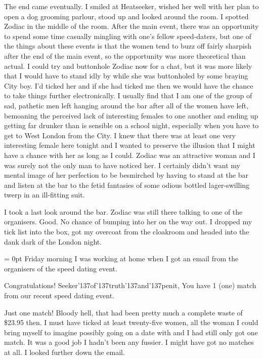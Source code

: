The end came eventually. I smiled at Heatseeker, wished her well
with her plan to open a dog grooming parlour, stood up and looked
around the room. I spotted Zodiac in the middle of the room. After
the main event, there was an opportunity to spend some time casually
mingling with one's fellow speed-daters, but one of the things about
these events is that the women tend to buzz off fairly sharpish
after the end of the main event, so the opportunity was more
theoretical than actual. I could try and buttonhole Zodiac now for a
chat, but it was more likely that I would have to stand idly by
while she was buttonholed by some braying City boy. I'd ticked her
and if she had ticked me then we would have the chance to take
things further electronically. I usually find that I am one of the
group of sad, pathetic men left hanging around the bar after all of
the women have left, bemoaning the perceived lack of interesting
females to one another and ending up getting far drunker than is
sensible on a school night, especially when you have to get to West
London from the City. I knew that there was at least one {\twelveit
very\/} interesting female here tonight and I wanted to preserve the
illusion that I might have a chance with her as long as I could.
Zodiac was an attractive woman and I was surely not the only man to
have noticed her. I certainly didn't want my mental image of her
perfection to be besmirched by having to stand at the bar and listen at the bar to the
fetid fantasies of some odious bottled lager-swilling twerp in an
ill-fitting suit.

I took a last look around the bar. Zodiac was still there talking to
one of the organisers. Good. No chance of bumping into her on the
way out. I dropped my tick list into the box, got my overcoat from
the cloakroom and headed into the dank dark of the London night.

\vskip 1cm

{\parindent = 0pt Friday morning I was working at home when I got an email from
the organisers of the speed dating event.}

\startmessage
Congratulations! Seeker{\twelvett\char'137}of{\twelvett\char'137}truth{\twelvett\char'137}and{\twelvett\char'137}penit,
You have 1 (one) match from our recent speed dating event.
\stopmessage

Just one match! Bloody hell, that had been pretty much a complete
waste of {\twelveit \$}23.95 then. I must have ticked at least
twenty-five women, all the woman I could bring myself to imagine
possibly going on a date with and I had still only got one match. It
was a good job I hadn't been any fussier. I might have got no
matches at all. I looked further down the email.

